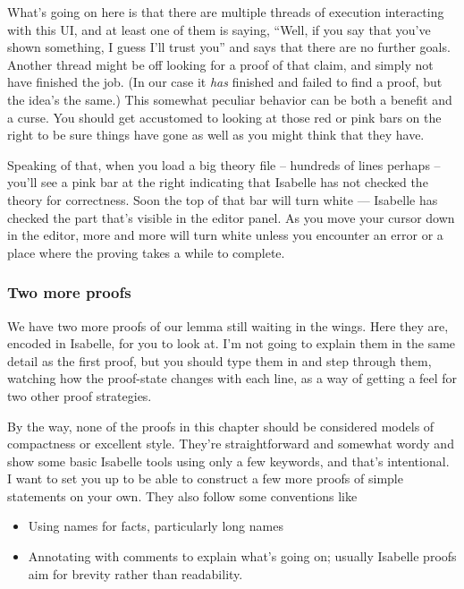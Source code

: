 What's going on here is that there are multiple threads of execution interacting with this UI, and at least one of them is saying, ``Well, if you say that you've shown something, I guess I'll trust you'' and says that there are no further goals. Another thread might be off looking for a proof of that claim, and simply not have finished the job. (In our case it \textit{has} finished and failed to find a proof, but the idea's the same.) This somewhat peculiar behavior can be both a benefit and a curse. You should get accustomed to looking at those red or pink bars on the right to be sure things have gone as well as you might think that they have. 

Speaking of that, when you load a big theory file -- hundreds of lines perhaps -- you'll see a pink bar at the right indicating that Isabelle has not checked the theory for correctness. Soon the top of that bar will turn white --- Isabelle has checked the part that's visible in the editor panel. As you move your cursor down in the editor, more and more will turn white unless you encounter an error or a place where the proving takes a while to complete. 

\subsubsection{Two more proofs}

We have two more proofs of our lemma still waiting in the wings. Here they are, encoded in Isabelle, for you to look at. I'm not going to explain them in the same detail as the first proof, but you should type them in and step through them, watching how the proof-state changes with each line, as a way of getting a feel for two other proof strategies. 

By the way, none of the proofs in this chapter should be considered models of compactness or excellent style. They're straightforward and somewhat wordy and show some basic Isabelle tools using only a few keywords, and that's intentional. I want to set you up to be able to construct a few more proofs of simple statements on your own. They also follow some conventions like 

\begin{itemize}
    \item Using names for facts, particularly long names
    \item Annotating with \isi{(* \ldots  *)} comments to explain what's going on; usually Isabelle proofs aim for brevity rather than readability.
\end{itemize}

